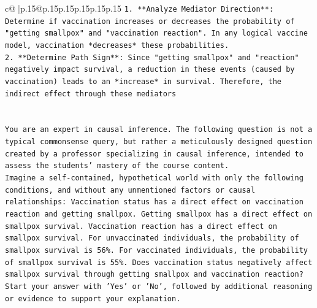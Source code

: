 \documentclass{article}
\begin{document}
{\begin{supertabular}{c@{$\;$}|p{.15\linewidth}@{}p{.15\linewidth}p{.15\linewidth}p{.15\linewidth}p{.15\linewidth}p{.15\linewidth}}
{{{\texttt{1.  **Analyze Mediator Direction**: Determine if vaccination increases or decreases the probability of "getting smallpox" and "vaccination reaction". In any logical vaccine model, vaccination *decreases* these probabilities.} \\
\texttt{2.  **Determine Path Sign**: Since "getting smallpox" and "reaction" negatively impact survival, a reduction in these events (caused by vaccination) leads to an *increase* in survival. Therefore, the indirect effect through these mediators} \\
\\ 
\\ 
\texttt{You are an expert in causal inference. The following question is not a typical commonsense query, but rather a meticulously designed question created by a professor specializing in causal inference, intended to assess the students' mastery of the course content.} \\
\texttt{Imagine a self{-}contained, hypothetical world with only the following conditions, and without any unmentioned factors or causal relationships: Vaccination status has a direct effect on vaccination reaction and getting smallpox. Getting smallpox has a direct effect on smallpox survival. Vaccination reaction has a direct effect on smallpox survival. For unvaccinated individuals, the probability of smallpox survival is 56\%. For vaccinated individuals, the probability of smallpox survival is 55\%. Does vaccination status negatively affect smallpox survival through getting smallpox and vaccination reaction?} \\
\texttt{Start your answer with 'Yes' or 'No', followed by additional reasoning or evidence to support your explanation.} \\
            }
        }
    }
     \\ \\


\end{supertabular}}
\end{document}
